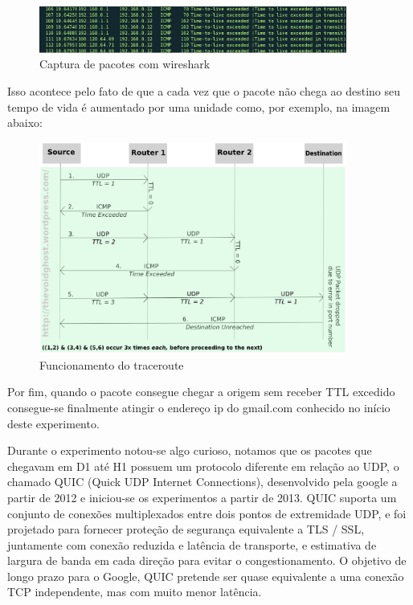 \begin{figure}[h]
  \centering
  \includegraphics[width=0.9\textwidth]{figuras/f8.eps}
  \caption{Captura de pacotes com wireshark}
  \label{fig:f8}
\end{figure}

Isso acontece pelo fato de que a cada vez que o pacote não chega ao destino
seu tempo de vida é aumentado por uma unidade como, por exemplo, na imagem abaixo:

\begin{figure}[h]
  \centering
  \includegraphics[width=0.9\textwidth]{figuras/f9.eps}
  \caption{Funcionamento do traceroute}
  \label{fig:f9}
\end{figure}

Por fim, quando o pacote consegue chegar a origem sem receber TTL excedido
consegue-se finalmente atingir o endereço ip do gmail.com conhecido no
início deste experimento.

Durante o experimento notou-se algo curioso, notamos que os pacotes que chegavam
em D1 até H1 possuem um protocolo diferente em relação ao UDP, o chamado QUIC
(Quick UDP Internet Connections), desenvolvido pela google a partir de 2012 e
iniciou-se os experimentos a partir de 2013. QUIC suporta um conjunto de conexões
multiplexados entre dois pontos de extremidade UDP, e foi projetado para fornecer
proteção de segurança equivalente a TLS / SSL, juntamente com conexão reduzida e
latência de transporte, e estimativa de largura de banda em cada direção para
evitar o congestionamento. O objetivo de longo prazo para o Google, QUIC
pretende ser quase equivalente a uma conexão TCP independente, mas com muito
menor latência.

